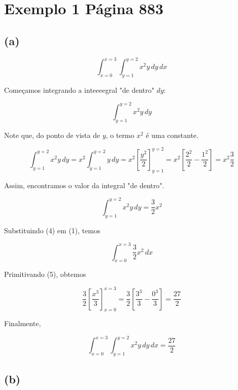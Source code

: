 
\section*{Exemplo 1 Página 883}

\subsection*{(a)}

\begin{equation}
    \int_{x=0}^{x=3} \int_{y=1}^{y=2} x^2y \, dy \, dx
\end{equation}

Começamos integrando a inteeeegral "de dentro" $dy$:

\begin{equation}
    \int_{y=1}^{y=2} x^2y \, dy
\end{equation}

Note que, do ponto de vista de $y$, o termo $x^2$ é uma constante.

\begin{equation}
    \int_{y=1}^{y=2} x^2y \, dy =
    x^2\int_{y=1}^{y=2} y \, dy =
    x^2 \left[\frac{y^2}{2}\right]_{y=1}^{y=2} =
    x^2 \left[\frac{2^2}{2} - \frac{1^2}{2}\right] =
    x^2 \frac{3}{2}
\end{equation}

Assim, encontramos o valor da integral "de dentro".

\begin{equation}
    \int_{y=1}^{y=2} x^2y \, dy = \frac{3}{2} x^2
\end{equation}

Substituindo (4) em (1), temos

\begin{equation}
    \int_{x=0}^{x=3} \frac{3}{2} x^2  \, dx
\end{equation}

Primitivando (5), obtemos

\begin{equation}
    \frac{3}{2} \left[\frac{x^3}{3}\right]_{x=0}^{x=3} = 
    \frac{3}{2} \left[\frac{3^3}{3} - \frac{0^3}{3}\right] = 
    \frac{27}{2}
\end{equation}

Finalmente,

\[ \boxed{\int_{x=0}^{x=3} \int_{y=1}^{y=2} x^2y \, dy \, dx = \frac{27}{2}}  \]

\subsection*{(b)}


